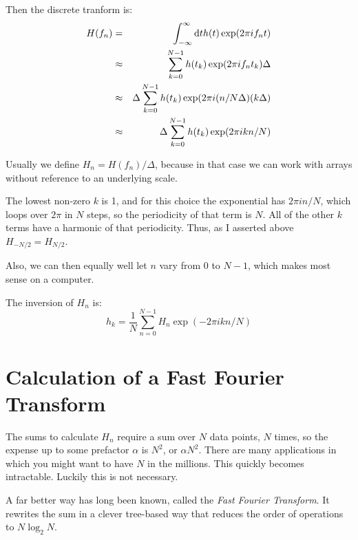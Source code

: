Then the discrete tranform is:
\begin{eqnarray}
H(f_n) &=& \int_{-\infty}^{\infty} {\rm d}t h(t) \exp(2\pi i f_n t) \cr
&\approx& \sum_{k=0}^{N-1} h(t_k) \exp(2\pi i f_n t_k) \Delta \cr
&\approx& \Delta \sum_{k=0}^{N-1} h(t_k) \exp(2\pi i (n / N\Delta)
(k\Delta) \cr
&\approx& \Delta \sum_{k=0}^{N-1} h(t_k) \exp(2\pi i k n / N)
\end{eqnarray}

Usually we define $H_n = H(f_n) / \Delta$, because in that case we can
work with arrays without reference to an underlying scale.


\begin{answer}
The lowest non-zero $k$ is 1, and for this choice the exponential has
$2\pi i n/N$, which loops over $2\pi$ in $N$ steps, so the periodicity
of that term is $N$. All of the other $k$ terms have a harmonic of
that periodicity. Thus, as I asserted above $H_{-N/2} = H_{N/2}$.

Also, we can then equally well let $n$ vary from $0$ to $N-1$, which
makes most sense on a computer.
\end{answer}

The inversion of $H_n$ is:
\begin{equation}
h_k = \frac{1}{N} \sum_{n=0}^{N-1} H_n \exp(-2\pi i k n/N)
\end{equation}

\section{Calculation of a Fast Fourier Transform}


\begin{answer}
The sums to calculate $H_n$ require a sum over $N$ data points, $N$
times, so the expense up to some prefactor $\alpha$ is $N^2$, or
$\alpha N^2$. There are many applications in which you might want to
have $N$ in the millions. This quickly becomes intractable. Luckily
this is not necessary.
\end{answer}

A far better way has long been known, called the {\it Fast Fourier
  Transform}. It rewrites the sum in a clever tree-based way that
reduces the order of operations to $N\log_2 N$.

